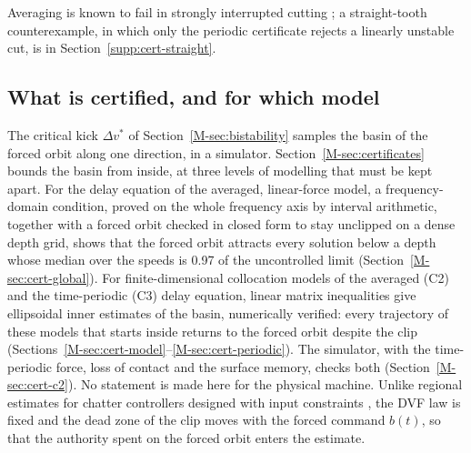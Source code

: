 Averaging is known to fail in strongly interrupted cutting \citep{davies2002stability,bayly2003stability,merdol2004multi}; a straight-tooth counterexample, in which only the periodic certificate rejects a linearly unstable cut, is in Section~\ref{supp:cert-straight}.

\subsection{What is certified, and for which model}\label{supp:std-levels}

The critical kick $\Delta v^*$ of Section~\ref{M-sec:bistability} samples the basin of the forced orbit along one direction, in a simulator. Section~\ref{M-sec:certificates} bounds the basin from inside, at three levels of modelling that must be kept apart. For the delay equation of the averaged, linear-force model, a frequency-domain condition, proved on the whole frequency axis by interval arithmetic, together with a forced orbit checked in closed form to stay unclipped on a dense depth grid, shows that the forced orbit attracts every solution below a depth whose median over the speeds is 0.97 of the uncontrolled limit (Section~\ref{M-sec:cert-global}). For finite-dimensional collocation models of the averaged (C2) and the time-periodic (C3) delay equation, linear matrix inequalities give ellipsoidal inner estimates of the basin, numerically verified: every trajectory of these models that starts inside returns to the forced orbit despite the clip (Sections~\ref{M-sec:cert-model}--\ref{M-sec:cert-periodic}). The simulator, with the time-periodic force, loss of contact and the surface memory, checks both (Section~\ref{M-sec:cert-c2}). No statement is made here for the physical machine. Unlike regional estimates for chatter controllers designed with input constraints \citep{zhang2015ellipsoid,wu2016adaptive}, the DVF law is fixed and the dead zone of the clip moves with the forced command $b(t)$, so that the authority spent on the forced orbit enters the estimate.

